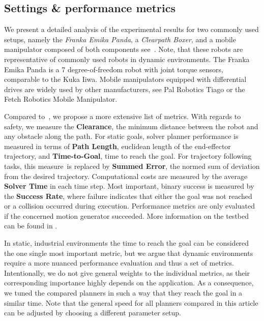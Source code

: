 \subsection{Settings \& performance metrics}%
\label{sub:settings}

We present a detailed analysis of the experimental results for two commonly used setups,
namely the \textit{Franka Emika Panda}, a \textit{Clearpath Boxer}, and a mobile manipulator
composed of both components
see~\cite{Spahn2021}. Note, that these
robots are representative of commonly used robots in dynamic environments. The
Franka Emika Panda is a 7 degree-of-freedom robot with joint torque sensors, comparable to the
Kuka Iiwa. Mobile manipulators equipped with differential drives are widely used by other
manufacturers, see Pal Robotics Tiago or the Fetch Robotics Mobile Manipulator.

Compared to~\cite{Cheng2020}, we propose a more extensive list of metrics.
With regards to safety, we measure the \textbf{Clearance}, the minimum distance
between the robot and any obstacle along the path.
For static goals, solver planner performance is measured in terms of
\textbf{Path Length}, euclidean length of the end-effector trajectory, and
\textbf{Time-to-Goal}, time to reach the goal. For trajectory following tasks,
this measure\ is replaced by \textbf{Summed Error}, the normed sum of deviation
from the desired trajectory. Computational costs are measured by the average
\textbf{Solver Time} in each time step. Most important, binary success is
measured by the \textbf{Success Rate}, where failure indicates that either the
goal was not reached or a collision occurred during execution. Performance
metrics are only evaluated if the concerned motion generator succeeded.
More information on the testbed can be found in \cite{spahn2022local}.
 
In static, industrial environments the time to reach the goal can be considered
the one single most important metric, but we argue that dynamic environments
require a more nuanced performance evaluation and thus a set of metrics.
Intentionally, we do not give general weights to the individual metrics, as
their corresponding importance highly depends on the application. As a
consequence, we tuned the compared planners in such a way that they reach the
goal in a similar time. Note that the general speed for all planners compared
in this article can be adjusted by choosing a different parameter setup.

